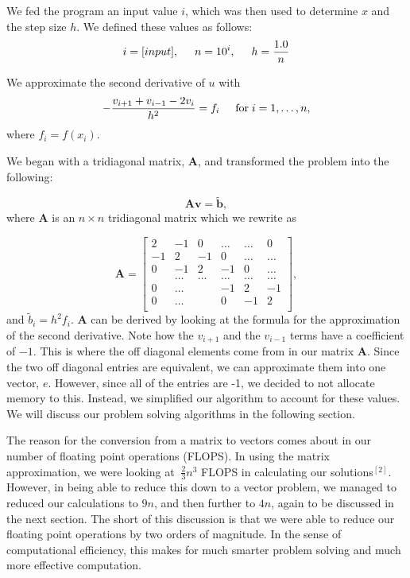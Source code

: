 \documentclass{article}
\begin{document}
We fed the program an input value $i$, which was then used to determine $x$ and the step size $h$. We defined these values as follows:
\begin{equation*}
i = [input], \hspace{0.5cm} n = 10^{i},\hspace{0.5cm}  h = \frac{1.0}{n}
\end{equation*}

We  approximate the second derivative of $u$ with
\begin{equation*}
-\frac{v_{i+1}+v_{i-1}-2v_i}{h^2} = f_i  \hspace{0.5cm} \mathrm{for} \hspace{0.1cm} i=1,\dots, n,
\end{equation*}
where $f_i=f(x_i)$.



We began with a tridiagonal matrix, $\mathbf{A}$, and transformed the problem into the following:

\begin{equation*}
\mathbf{A}\mathbf{v} = \tilde{\mathbf{b}},
\end{equation*}
where $\mathbf{A}$ is an $n\times n$  tridiagonal matrix which we rewrite as

\[
\mathbf{A} = \begin{bmatrix}
2& -1& 0 &\dots   & \dots &0 \\
-1 & 2 & -1 &0 &\dots &\dots \\
0&-1 &2 & -1 & 0 & \dots \\
& \dots   & \dots &\dots   &\dots & \dots \\
0&\dots   &  &-1 &2& -1 \\
0&\dots    &  & 0  &-1 & 2 \\
\end{bmatrix},
\]
and $\tilde{b}_i=h^2f_i$.  $\mathbf{A}$ can be derived by looking at the formula for the approximation of the second derivative. Note how the $v_{i+1}$ and the $v_{i-1}$ terms have a coefficient of $-1$. This is where the off diagonal elements come from in our matrix $\mathbf{A}$. Since the two off diagonal entries are equivalent, we can approximate them into one vector, $e$. However, since all of the entries are -1, we decided to not allocate memory to this. Instead, we simplified our algorithm to account for these values. We will discuss our problem solving algorithms in the following section.

The reason for the conversion from a matrix to vectors comes about in our number of floating point operations (FLOPS). In using the matrix approximation, we were looking at $~\frac{2}{3}n^{3}$ FLOPS in calculating our solutions$^{[2]}$. However, in being able to reduce this down to a vector problem, we managed to reduced our calculations to $9n$, and then further to $4n$, again to be discussed in the next section. The short of this discussion is that we were able to reduce our floating point operations by two orders of magnitude. In the sense of computational efficiency, this makes for much smarter problem solving and much more effective computation. 
\end{document}
